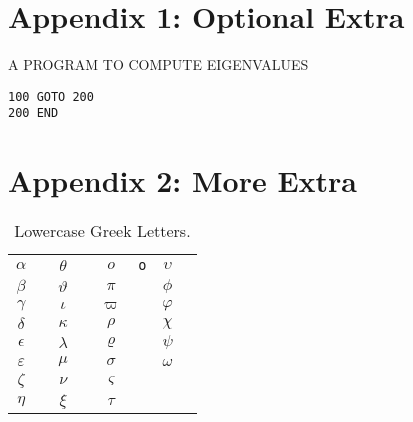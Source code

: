 \documentclass{report}
\begin{document}
\chapter*{Appendix 1: Optional Extra}

\begin{center}
   {\Large A PROGRAM TO COMPUTE EIGENVALUES}
\end{center}

\begin{verbatim}    
100 GOTO 200
200 END
\end{verbatim}    

\chapter*{Appendix 2: More Extra}


%
%
\newcommand{\X}[1]{$#1$&\texttt{\string#1}\hspace*{1ex}}
\newsavebox{\symbbox}
\newenvironment{symbols}[1]%
{\par\vspace*{2ex}
\begin{lrbox}{\symbbox}
\hspace*{4ex}\begin{tabular}{@{}#1@{}}}%
{\end{tabular}\end{lrbox}\makebox[\textwidth]{\usebox{\symbbox}}\par\medskip}



\begin{table}[!h]
\caption{Lowercase Greek Letters.}
\begin{symbols}{*4{cl}}
 \X{\alpha}     & \X{\theta}     & \X{o}          & \X{\upsilon}  \\
 \X{\beta}      & \X{\vartheta}  & \X{\pi}        & \X{\phi}      \\
 \X{\gamma}     & \X{\iota}      & \X{\varpi}     & \X{\varphi}   \\
 \X{\delta}     & \X{\kappa}     & \X{\rho}       & \X{\chi}      \\
 \X{\epsilon}   & \X{\lambda}    & \X{\varrho}    & \X{\psi}      \\
 \X{\varepsilon}& \X{\mu}        & \X{\sigma}     & \X{\omega}    \\
 \X{\zeta}      & \X{\nu}        & \X{\varsigma}  & &             \\
 \X{\eta}       & \X{\xi}        & \X{\tau} 
\end{symbols}
\end{table}
\end{document}
